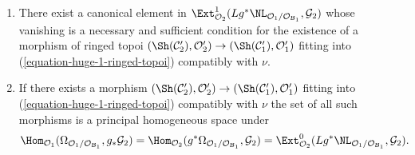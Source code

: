 \begin{lemma}
\begin{enumerate}
\item There exist a canonical element in
$\Ext^1_{\mathcal{O}_2}(
Lg^*\NL_{\mathcal{O}_1/\mathcal{O}_{\mathcal{B}_1}}, \mathcal{G}_2)$
whose vanishing is a necessary and sufficient condition for the existence
of a morphism of ringed topoi
$(\Sh(\mathcal{C}'_2), \mathcal{O}'_2) \to
(\Sh(\mathcal{C}'_1), \mathcal{O}'_1)$ fitting into
(\ref{equation-huge-1-ringed-topoi}) compatibly with $\nu$.
\item If there exists a morphism
$(\Sh(\mathcal{C}'_2), \mathcal{O}'_2) \to
(\Sh(\mathcal{C}'_1), \mathcal{O}'_1)$
fitting into
(\ref{equation-huge-1-ringed-topoi}) compatibly with $\nu$ the set
of all such morphisms is a principal homogeneous space under
$$
\Hom_{\mathcal{O}_1}(
\Omega_{\mathcal{O}_1/\mathcal{O}_{\mathcal{B}_1}}, g_*\mathcal{G}_2) =
\Hom_{\mathcal{O}_2}(
g^*\Omega_{\mathcal{O}_1/\mathcal{O}_{\mathcal{B}_1}}, \mathcal{G}_2) =
\Ext^0_{\mathcal{O}_2}(
Lg^*\NL_{\mathcal{O}_1/\mathcal{O}_{\mathcal{B}_1}}, \mathcal{G}_2).
$$
\end{enumerate}
\end{lemma}

